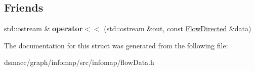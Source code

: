 \subsection*{Friends}
\begin{DoxyCompactItemize}
\item 
\mbox{\label{structFlowDirected_a3d5e9649c837f6fb238aeff23375aa90}} 
std\+::ostream \& {\bfseries operator$<$$<$} (std\+::ostream \&out, const \mbox{\hyperlink{structFlowDirected}{Flow\+Directed}} \&data)
\end{DoxyCompactItemize}


The documentation for this struct was generated from the following file\+:\begin{DoxyCompactItemize}
\item 
dsmacc/graph/infomap/src/infomap/flow\+Data.\+h\end{DoxyCompactItemize}
